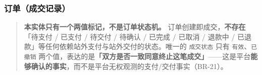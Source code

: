 \documentclass[12pt,a4paper]{ctexart}
\begin{document}
\subsubsection*{订单（成交记录）}

\begin{quote}\small
\textbf{本实体只有一个两值标记，不是订单状态机。} 订单创建即成交，\textbf{不存在}「待支付 / 已支付 / 待交付 / 待确认 / 已完成 / 已取消 / 退款中 / 已退款」等任何依赖站外支付与站外交付的状态。唯一的 \texttt{成交状态} 只有 \texttt{有效}、\texttt{已撤销} 两个值，表达的是\textbf{「双方是否一致同意终止这笔成交」}——这是平台\textbf{能够确认的事实}，而不是平台无权观测的支付/交付事实（BR-21）。

\end{quote}
\end{document}
